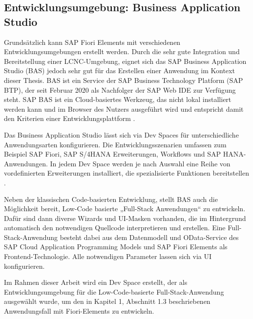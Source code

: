 \subsection{Entwicklungsumgebung: Business Application Studio} 
Grundsätzlich kann SAP Fiori Elements mit verschiedenen Entwicklungsumgebungen erstellt werden. Durch die sehr gute Integration und Bereitstellung einer LCNC-Umgebung, eignet sich das SAP Business Application Studio (BAS) jedoch sehr gut für das Erstellen einer Anwendung im Kontext dieser Thesis. BAS ist ein Service der SAP Business Technology Platform (SAP BTP), der seit Februar 2020 als Nachfolger der SAP Web IDE zur Verfügung steht. SAP BAS ist ein Cloud-basiertes Werkzeug, das nicht lokal installiert werden kann und im Browser des Nutzers ausgeführt wird und entspricht damit den Kriterien einer Entwicklungsplattform \cite{btp:ov}.

Das Business Application Studio lässt sich via Dev Spaces für unterschiedliche Anwendungsarten konfigurieren. Die Entwicklungsszenarien umfassen zum Beispiel SAP Fiori, SAP S/4HANA Erweiterungen, Workflows und SAP HANA-Anwendungen. In jedem Dev Space werden je nach Auswahl eine Reihe von vordefinierten Erweiterungen installiert, die spezialisierte Funktionen bereitstellen \cite{btp:ov}.

Neben der klassischen Code-basierten Entwicklung, stellt BAS auch die Möglichkeit bereit, Low-Code basierte „Full-Stack Anwendungen“ zu entwickeln. Dafür sind dann diverse Wizards und UI-Masken vorhanden, die im Hintergrund automatisch den notwendigen Quellcode interpretieren und erstellen. Eine Full-Stack-Anwendung besteht dabei aus dem Datenmodell und OData-Service des SAP Cloud Application Programming Models und SAP Fiori Elements als Frontend-Technologie. Alle notwendigen Parameter lassen sich via UI konfigurieren.

Im Rahmen dieser Arbeit wird ein Dev Space erstellt, der als Entwicklungsumgebung für die Low-Code-basierte Full-Stack-Anwendung ausgewählt wurde, um den in Kapitel 1, Abschnitt 1.3 beschriebenen Anwendungsfall mit Fiori-Elements zu entwickeln. 

